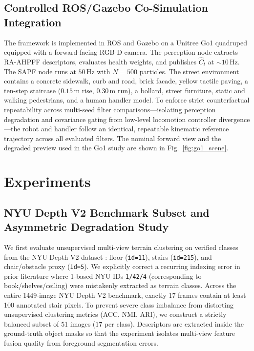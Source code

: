 \documentclass[11pt, a4paper]{article}
\begin{document}
\subsection{Controlled ROS/Gazebo Co-Simulation Integration}
\label{subsec:ros_setup}
The framework is implemented in ROS \cite{quigley2009ros} and Gazebo \cite{koenig2004design} on a Unitree Go1 quadruped equipped with a forward-facing RGB-D camera. The perception node extracts RA-AHPFF descriptors, evaluates health weights, and publishes $\hat{C}_t$ at $\sim 10\,\text{Hz}$. The SAPF node runs at $50\,\text{Hz}$ with $N=500$ particles. The street environment contains a concrete sidewalk, curb and road, brick facade, yellow tactile paving, a ten-step staircase ($0.15\,\text{m}$ rise, $0.30\,\text{m}$ run), a bollard, street furniture, static and walking pedestrians, and a human handler model. To enforce strict counterfactual repeatability across multi-seed filter comparisons—isolating perception degradation and covariance gating from low-level locomotion controller divergence—the robot and handler follow an identical, repeatable kinematic reference trajectory across all evaluated filters. The nominal forward view and the degraded preview used in the Go1 study are shown in Fig.~\ref{fig:go1_scene}.

\section{Experiments}
\label{sec:experiments}

\subsection{NYU Depth V2 Benchmark Subset and Asymmetric Degradation Study}
\label{subsec:nyu}
We first evaluate unsupervised multi-view terrain clustering on verified classes from the NYU Depth V2 dataset \cite{silberman2012indoor}: floor (\texttt{id=11}), stairs (\texttt{id=215}), and chair/obstacle proxy (\texttt{id=5}). We explicitly correct a recurring indexing error in prior literature where 1-based NYU IDs \texttt{1/42/4} (corresponding to book/shelves/ceiling) were mistakenly extracted as terrain classes. Across the entire 1449-image NYU Depth V2 benchmark, exactly 17 frames contain at least 100 annotated stair pixels. To prevent severe class imbalance from distorting unsupervised clustering metrics (ACC, NMI, ARI), we construct a strictly balanced subset of 51 images (17 per class). Descriptors are extracted inside the ground-truth object masks so that the experiment isolates multi-view feature fusion quality from foreground segmentation errors.
\end{document}
